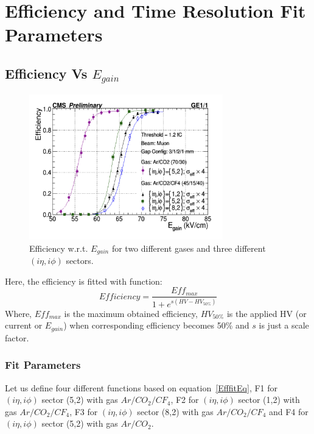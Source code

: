 \chapter{Efficiency and Time Resolution Fit Parameters} %
\label{cha:efficiency_and_time_resolution_fit_parameters}

\section{Efficiency Vs $E_{gain}$} %
\label{sec:efficiency_vs_egain}
\begin{figure}[!htbp]
\centering
\includegraphics[width=0.75\textwidth]{figures/GEM/Efficiency_EGain.jpeg}
\caption{Efficiency w.r.t. $E_{gain}$ for two different gases and three different $(i\eta,i\phi)$ sectors.}
\label{Efficiency1}
\end{figure}
Here, the efficiency is fitted with function:
\begin{equation}\label{EfffitEq}
    Efficiency = \frac{Eff_{max}}{1+e^{s(HV-HV_{50\%})}}
\end{equation}
Where, $Eff_{max}$ is the maximum obtained efficiency, $HV_{50\%}$ is the applied HV (or current or $E_{gain}$) when corresponding efficiency becomes 50\% and $s$ is just a scale factor.

\subsection{Fit Parameters} %
\label{sub:fit_parameters}
Let us define four different functions based on equation~\ref{EfffitEq}, F1 for $(i\eta,i\phi)$ sector (5,2) with gas $Ar/CO_2/CF_4$, F2 for $(i\eta,i\phi)$ sector (1,2) with gas $Ar/CO_2/CF_4$, F3 for $(i\eta,i\phi)$ sector (8,2) with gas $Ar/CO_2/CF_4$ and F4 for $(i\eta,i\phi)$ sector (5,2) with gas $Ar/CO_2$.

